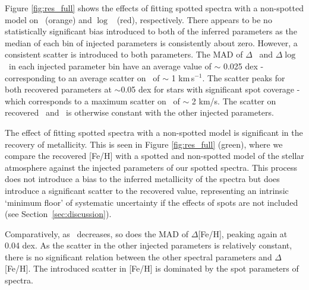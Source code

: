 Figure \ref{fig:res_full} shows the effects of fitting spotted spectra with a non-spotted model on \logg\ (orange) and $\log$ \vsini\ (red), respectively.
There appears to be no statistically significant bias introduced to both of the inferred parameters as the median of each bin of injected parameters is consistently about zero. However, a consistent scatter is introduced to both parameters. The MAD of $\Delta$ \logg\ and $\Delta \log$ \vsini\ in each injected parameter bin have an average value of $\sim$ 0.025 dex - corresponding to an average scatter on \vsini\ of $\sim$ 1 km\,s$^{-1}$. The scatter peaks for both recovered parameters at $\sim$0.05 dex for stars with significant spot coverage - which corresponds to a maximum scatter on \vsini\ of $\sim$ 2 km/s. The scatter on recovered \vsini\ and \logg\ is otherwise constant with the other injected parameters.

The effect of fitting spotted spectra with a non-spotted model is significant in the recovery of metallicity. This is seen in Figure \ref{fig:res_full} (green), where we compare the recovered [Fe/H] with a spotted and non-spotted model of the stellar atmosphere against the injected parameters of our spotted spectra. This process does not introduce a bias to the inferred metallicity of the spectra but does introduce a significant scatter to the recovered value, representing an intrinsic `minimum floor' of systematic uncertainty if the effects of spots are not included (see Section~\ref{sec:discussion}).

 Comparatively, as \xspot\ decreases, so does the MAD of $\Delta$[Fe/H], peaking again at 0.04 dex. As the scatter in the other injected parameters is relatively constant, there is no significant relation between the other spectral parameters and $\Delta$[Fe/H]. The introduced scatter in [Fe/H] is dominated by the spot parameters of spectra.


